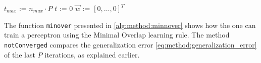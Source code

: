 
\begin{algorithm}
	\SetAlgoShortEnd
	\DontPrintSemicolon
	\BlankLine

	$t_{max}$ := $n_{max} \cdot P$\;
	$t$ := 0\;
	$\vec{w}$ := $[0, \dotsc, 0]^T$ 

	\caption{$minover(\mathcal{D}, n_{max}, \vec{w})$\label{alg:method:minnover}}
\end{algorithm}

The function \texttt{minover} presented in \autoref{alg:method:minnover} shows how the one can train a perceptron using the Minimal Overlap learning rule. The method \texttt{notConverged} compares the generalization error \eqref{eq:method:generalization_error} of the last $P$ iterations, as explained earlier. 
